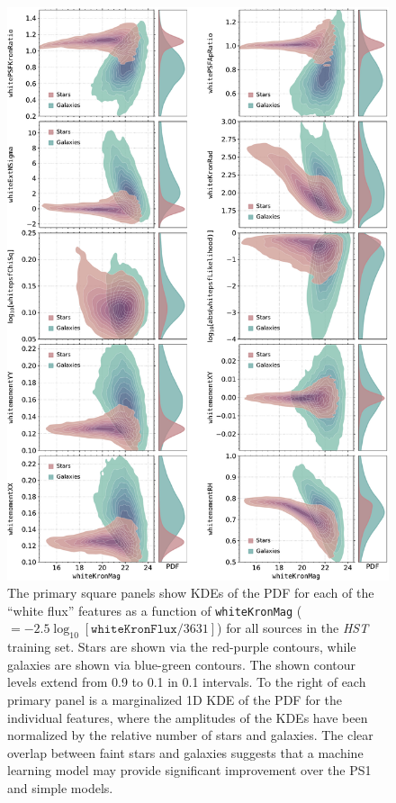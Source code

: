 \documentclass[twocolumn, dvipdfmx]{aastex62}
\begin{document}
\begin{figure}[htb]
 \centering
  \includegraphics[width=5.75in]{./Figures/whiteFeatures.pdf}
  \caption{
  The primary square panels show KDEs of the PDF for each of the ``white
  flux'' features as a function of \texttt{whiteKronMag}
  ($=-2.5\log_{10}[\mathtt{whiteKronFlux}/3631]$) for all sources in the
  \textit{HST} training set. Stars are shown via the red-purple contours,
  while galaxies are shown via blue-green contours. The shown contour levels
  extend from 0.9 to 0.1 in 0.1 intervals. To the right of each primary panel
  is a marginalized 1D KDE of the PDF for the individual features, where the
  amplitudes of the KDEs have been normalized by the relative number of stars
  and galaxies. The clear overlap between faint stars and galaxies suggests
  that a machine learning model may provide significant improvement over the
  PS1 and simple models.}
  \label{fig:features}
\end{figure}
\end{document}
